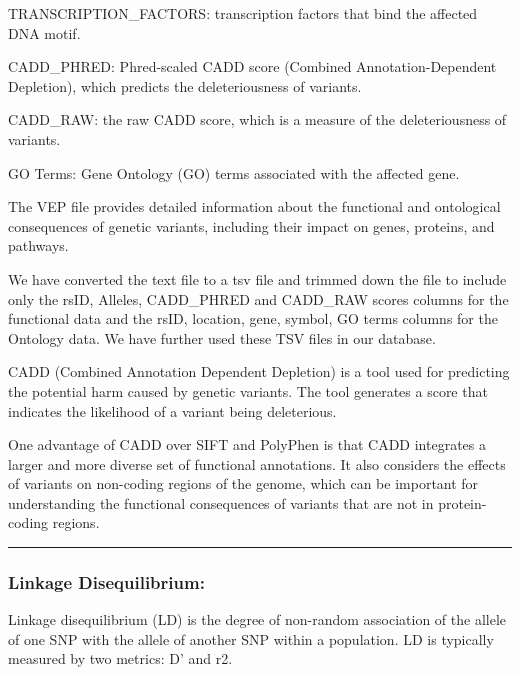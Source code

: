\documentclass[12pt,a4paper]{article}
\begin{document}
{TRANSCRIPTION\_FACTORS: transcription factors that bind the affected
DNA motif.}

{CADD\_PHRED: Phred-scaled CADD score (Combined Annotation-Dependent
Depletion), which predicts the deleteriousness of variants.}

{CADD\_RAW: the raw CADD score, which is a measure of the
deleteriousness of variants.}

{GO Terms: Gene Ontology (GO) terms associated with the affected gene.}

{The VEP file provides detailed information about the functional and
ontological consequences of genetic variants, including their impact on
genes, proteins, and pathways.}

{We have converted the text file to a tsv file and trimmed down the file
to include only the rsID, Alleles, CADD\_PHRED and CADD\_RAW scores
columns for the functional data and the rsID, location, gene, symbol, GO
terms columns for the Ontology data. We have further used these TSV
files in our database.}

{CADD (Combined Annotation Dependent Depletion) is a tool used for
predicting the potential harm caused by genetic variants. The tool
generates a score that indicates the likelihood of a variant being
deleterious.}

{One advantage of CADD over SIFT and PolyPhen is that CADD integrates a
larger and more diverse set of functional annotations. It also considers
the effects of variants on non-coding regions of the genome, which can
be important for understanding the functional consequences of variants
that are not in protein-coding regions.}

{}

\begin{center}\rule{0.5\linewidth}{0.5pt}\end{center}

\hypertarget{h.bob8u1u023ib}{%
\subsubsection{\texorpdfstring{{}}{}}\label{h.bob8u1u023ib}}

\hypertarget{h.x88z4oadkpbf}{%
\subsubsection{\texorpdfstring{{Linkage
Disequilibrium:}}{Linkage Disequilibrium:}}\label{h.x88z4oadkpbf}}

{Linkage disequilibrium (LD) is the degree of non-random association of
the allele of one SNP with the allele of another SNP within a
population. LD is typically measured by two metrics: D' and r}{2}{. }
\end{document}
